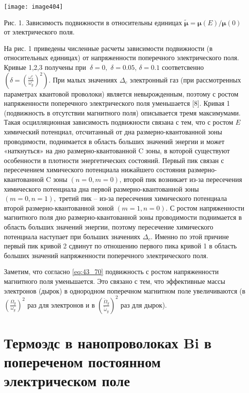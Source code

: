 \noindent \texttt{[image: image404]}

\noindent Рис. 1. Зависимость подвижности в относительны единицах $\widetilde{{\mathbf \mu }}={{\mathbf \mu }\left(E\right)}/{{\mathbf \mu }\left(0\right)}$ от электрического поля.

На рис. 1 приведены численные расчеты зависимости подвижности (в относительных единицах) от напряженности поперечного электрического поля. Кривые 1,2,3 получены при $\ \delta =0,$ $\delta =0.05$, $\delta =0.1$ соответсвенно $\left(\delta ={\left(\frac{{\omega }^c_x}{{\omega }_y}\right)}^2\right)$. При малых значениях ${\Delta }_c$ электронный газ (при рассмотренных параметрах квантовой проволоки) является невырожденным, поэтому с ростом напряженности поперечного электрического поля уменьшается [8]. Кривая 1 (подвижность в отсутствии  магнитного поля) описывается тремя максимумами. Такая осцилляционная зависимость подвижности связана с тем, что с ростом $E$ химический потенциал, отсчитанный от дна размерно-квантованной зоны проводимости, поднимается в область больших значений энергии и может «наткнуться» на дно размерно-квантованной C зоны, в которой существуют особенности в плотности энергетических состояний. Первый пик связан с пересечением химического потенциала нижайшего состояния размерно-квантованной C зоны $\left(n=0,m=0\right)$, второй пик возникает из-за пересечения химического потенциала дна первой размерно-квантованной зоны $\left(m=0,n=1\right),$ третий пик -- из-за пересечения химического потенциала второй размерно-квантованной зоной $\left(m=1,n=0\right)$. С ростом напряженности магнитного поля дно размерно-квантованной зоны проводимости поднимается в область больших значений энергии, поэтому пересечение химического потенциала наступает при больших значениях ${\Delta }_c$. Именно по этой причине первый пик кривой 2  сдвинут по отношению первого пика кривой 1 в область больших значений напряженности поперечного электрического поля.

Заметим, что согласно \eqref{eq:43_70} подвижность с ростом напряженности магнитного поля уменьшается. Это связано с тем, что эффективные массы электронов (дырок) в однородном поперечном магнитном поле увеличиваются (в ${\left(\frac{\Omega_y}{\omega_y}\right)}^2$ раз для электронов и в ${\left(\frac{{\widetilde{\Omega }}_y}{{\widetilde{\omega }}_y}\right)}^2$ раз для дырок).

\section{Термоэдс в нанопроволоках Bi в попереченом постоянном электрическом поле}\label{sect4_4}


